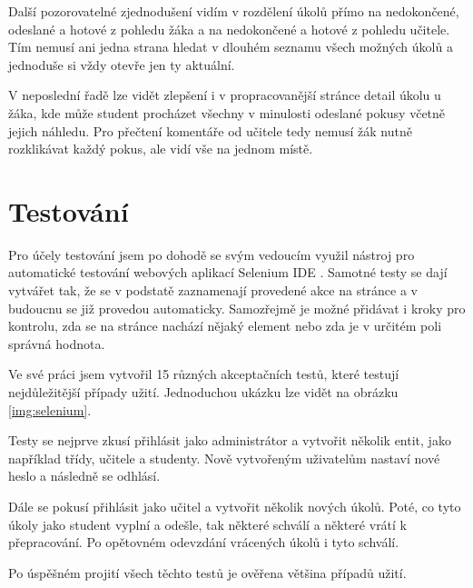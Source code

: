 \documentclass[twoside]{ctuthesis}
\theoremstyle{plain}
\theoremstyle{definition}
\theoremstyle{note}
\begin{document}
Další pozorovatelné zjednodušení vidím v rozdělení úkolů přímo na nedokončené, odeslané a hotové z pohledu žáka a na nedokončené a hotové z pohledu učitele. Tím nemusí ani jedna strana hledat v dlouhém seznamu všech možných úkolů a jednoduše si vždy otevře jen ty aktuální.

V neposlední řadě lze vidět zlepšení i v propracovanější stránce detail úkolu u žáka, kde může student procházet všechny v minulosti odeslané pokusy včetně jejich náhledu. Pro přečtení komentáře od učitele tedy nemusí žák nutně rozklikávat každý pokus, ale vidí vše na jednom místě.


\chapter{Testování}
Pro účely testování jsem po dohodě se svým vedoucím využil nástroj pro automatické testování webových aplikací Selenium IDE \cite{selenium}. Samotné testy se dají vytvářet tak, že se v podstatě zaznamenají provedené akce na stránce a v budoucnu se již provedou automaticky. Samozřejmě je možné přidávat i kroky pro kontrolu, zda se na stránce nachází nějaký element nebo zda je v určitém poli správná hodnota.

Ve své práci jsem vytvořil 15 různých akceptačních testů, které testují nejdůležitější případy užití. Jednoduchou ukázku lze vidět na obrázku \ref{img:selenium}.

Testy se nejprve zkusí přihlásit jako administrátor a vytvořit několik entit, jako například třídy, učitele a studenty. Nově vytvořeným uživatelům nastaví nové heslo a následně se odhlásí.

Dále se pokusí přihlásit jako učitel a vytvořit několik nových úkolů. Poté, co tyto úkoly jako student vyplní a odešle, tak některé schválí a některé vrátí k přepracování. Po opětovném odevzdání vrácených úkolů i tyto schválí.

Po úspěšném projití všech těchto testů je ověřena většina případů užití.
\end{document}
